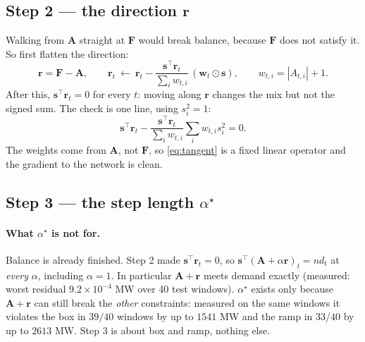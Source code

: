 \documentclass[11pt]{article}
\begin{document}
\subsection*{Step 2 --- the direction $\mathbf{r}$}

Walking from $\mathbf{A}$ straight at $\mathbf{F}$ would break balance, because
$\mathbf{F}$ does not satisfy it. So first flatten the direction:
\begin{equation}
\mathbf{r}=\mathbf{F}-\mathbf{A},
\qquad
\mathbf{r}_t\ \leftarrow\ \mathbf{r}_t-\frac{\mathbf{s}^{\!\top}\mathbf{r}_t}{\sum_i w_{t,i}}\,(\mathbf{w}_t\odot\mathbf{s}),
\qquad w_{t,i}=|A_{t,i}|+1 .
\label{eq:tangent}
\end{equation}
After this, $\mathbf{s}^{\!\top}\mathbf{r}_t=0$ for every $t$: moving along
$\mathbf{r}$ changes the mix but not the signed sum. The check is one line, using $s_i^2=1$:
\[
\mathbf{s}^{\!\top}\mathbf{r}_t-\frac{\mathbf{s}^{\!\top}\mathbf{r}_t}{\sum_i w_{t,i}}\sum_i w_{t,i}s_i^{2}=0 .
\]
The weights come from $\mathbf{A}$, not $\mathbf{F}$, so \eqref{eq:tangent} is a
fixed linear operator and the gradient to the network is clean.

\subsection*{Step 3 --- the step length $\alpha^{\star}$}

\paragraph{What $\alpha^{\star}$ is not for.} Balance is already finished. Step 2
made $\mathbf{s}^{\!\top}\mathbf{r}_t=0$, so
$\mathbf{s}^{\!\top}(\mathbf{A}+\alpha\mathbf{r})_t=nd_t$ at \emph{every}
$\alpha$, including $\alpha=1$. In particular $\mathbf{A}+\mathbf{r}$ meets
demand exactly (measured: worst residual $9.2\times10^{-4}$ MW over 40 test
windows). $\alpha^{\star}$ exists only because $\mathbf{A}+\mathbf{r}$ can still
break the \emph{other} constraints: measured on the same windows it violates the
box in $39/40$ windows by up to $1541$ MW and the ramp in $33/40$ by up to
$2613$ MW. Step 3 is about box and ramp, nothing else.
\end{document}
